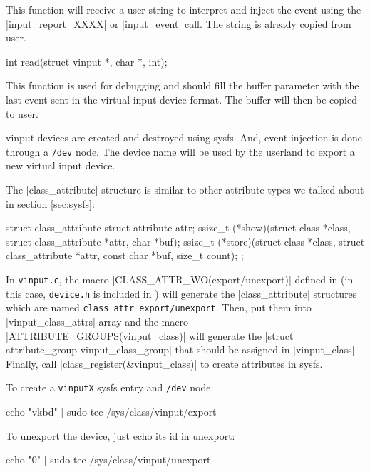 \documentclass[10pt, oneside]{book}
\begin{document}
This function will receive a user string to interpret and inject the event using the \cpp|input_report_XXXX| or \cpp|input_event| call.
The string is already copied from user.

\begin{code}
int read(struct vinput *, char *, int);
\end{code}

This function is used for debugging and should fill the buffer parameter with the last event sent in the virtual input device format.
The buffer will then be copied to user.

vinput devices are created and destroyed using sysfs.
And, event injection is done through a \verb|/dev| node.
The device name will be used by the userland to export a new virtual input device.

The \cpp|class_attribute| structure is similar to other attribute types we talked about in section \ref{sec:sysfs}:

\begin{code}
struct class_attribute {
    struct attribute attr;
    ssize_t (*show)(struct class *class, struct class_attribute *attr,
                    char *buf);
    ssize_t (*store)(struct class *class, struct class_attribute *attr,
                    const char *buf, size_t count);
};
\end{code}

In \verb|vinput.c|, the macro \cpp|CLASS_ATTR_WO(export/unexport)| defined in  (in this case, \verb|device.h| is included in ) will generate the \cpp|class_attribute| structures which are named \verb|class_attr_export/unexport|.
Then, put them into \cpp|vinput_class_attrs| array and the macro \cpp|ATTRIBUTE_GROUPS(vinput_class)| will generate the \cpp|struct attribute_group vinput_class_group| that should be assigned in \cpp|vinput_class|.
Finally, call \cpp|class_register(&vinput_class)| to create attributes in sysfs.

To create a \verb|vinputX| sysfs entry and \verb|/dev| node.

\begin{codebash}
echo "vkbd" | sudo tee /sys/class/vinput/export
\end{codebash}

To unexport the device, just echo its id in unexport:

\begin{codebash}
echo "0" | sudo tee /sys/class/vinput/unexport
\end{codebash}
\end{document}
